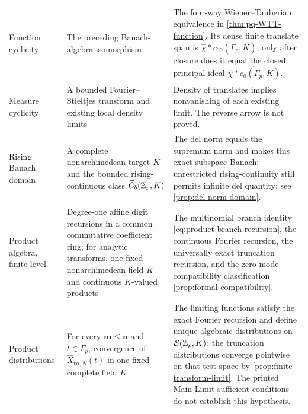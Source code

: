 \begin{longtable}{@{}p{}p{}p{}@{}}
Function cyclicity & The preceding Banach-algebra isomorphism & The four-way
Wiener--Tauberian equivalence in \cref{thm:pq-WTT-function}.  Its dense
finite translate span is
$\widehat\chi*c_{00}(\Gamma_p,K)$; only after closure does it equal the
closed principal ideal
$\overline{\widehat\chi*c_0(\Gamma_p,K)}$.\\

Measure cyclicity & A bounded Fourier--Stieltjes transform and existing local
density limits & Density of translates implies nonvanishing of each existing
limit.  The reverse arrow is not proved.\\

Rising Banach domain & A complete nonarchimedean target $K$ and the bounded
rising-continuous class $\widetilde C_b(\mathbb Z_p,K)$ & The del norm equals the
supremum norm and makes this exact subspace Banach; unrestricted
rising-continuity still permits infinite del quantity; see
\cref{prop:del-norm-domain}.\\

Product algebra, finite level & Degree-one affine digit recursions in a common
commutative coefficient ring; for analytic transforms, one fixed
nonarchimedean field $K$ and continuous $K$-valued products & The
multinomial branch identity \cref{eq:product-branch-recursion}, the continuous
Fourier recursion, the universally exact truncation recursion, and the
zero-mode compatibility classification \cref{prop:formal-compatibility}.\\

Product distributions & For every $\mathbf m\leq\mathbf n$ and
$t\in\Gamma_p$, convergence of
$\widehat X_{\mathbf m,N}(t)$ in one fixed complete field $K$ & The limiting
functions satisfy the exact Fourier recursion and define unique algebraic
distributions on $\mathcal S(\mathbb Z_p,K)$; the truncation distributions converge
pointwise on that test space by \cref{prop:finite-transform-limit}.  The
printed Main Limit sufficient conditions do not establish this hypothesis.\\
\bottomrule
\end{longtable}
\endgroup

